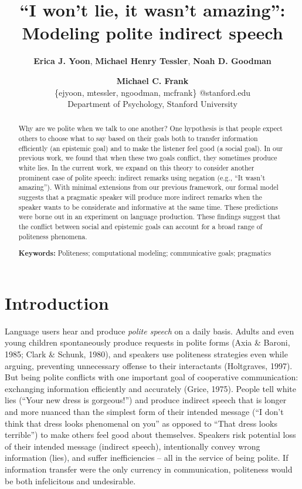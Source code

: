 \documentclass[10pt, letterpaper]{article}
\title{``I won't lie, it wasn't amazing'': Modeling polite indirect speech}
\author{{\large \bf Erica J. Yoon}, {\large \bf Michael Henry Tessler}, {\large \bf Noah D. Goodman} \and {\large \bf Michael C. Frank}  \\
        \{ejyoon, mtessler, ngoodman, mcfrank\} @stanford.edu \\ 
        Department of Psychology, Stanford University}
\begin{document}
\maketitle

\begin{abstract}
Why are we polite when we talk to one another? One hypothesis is that
people expect others to choose what to say based on their goals both to
transfer information efficiently (an epistemic goal) and to make the
listener feel good (a social goal). In our previous work, we found that
when these two goals conflict, they sometimes produce white lies. In the
current work, we expand on this theory to consider another prominent
case of polite speech: indirect remarks using negation (e.g., ``It
wasn't amazing''). With minimal extensions from our previous framework,
our formal model suggests that a pragmatic speaker will produce more
indirect remarks when the speaker wants to be considerate and
informative at the same time. These predictions were borne out in an
experiment on language production. These findings suggest that the
conflict between social and epistemic goals can account for a broad
range of politeness phenomena.

\textbf{Keywords:}
Politeness; computational modeling; communicative goals; pragmatics
\end{abstract}

 
 

\newcommand{\ejy}[1]{\textcolor{Red}{[ejy: #1]}}  
\newcommand{\ndg}[1]{\textcolor{Green}{[ndg: #1]}}  
\newcommand{\mht}[1]{\textcolor{Blue}{[mht: #1]}}  
\newcommand{\mcf}[1]{\textcolor{Orange}{[mcf: #1]}}







\section{Introduction}\label{introduction}

Language users hear and produce \emph{polite speech} on a daily basis.
Adults and even young children spontaneously produce requests in polite
forms (Axia \& Baroni, 1985; Clark \& Schunk, 1980), and speakers use
politeness strategies even while arguing, preventing unnecessary offense
to their interactants (Holtgraves, 1997). But being polite conflicts
with one important goal of cooperative communication: exchanging
information efficiently and accurately (Grice, 1975). People tell white
lies (``Your new dress is gorgeous!'') and produce indirect speech that
is longer and more nuanced than the simplest form of their intended
message (``I don't think that dress looks phenomenal on you'' as opposed
to ``That dress looks terrible'') to make others feel good about
themselves. Speakers risk potential loss of their intended message
(indirect speech), intentionally convey wrong information (lies), and
suffer inefficiencies -- all in the service of being polite. If
information transfer were the only currency in communication, politeness
would be both infelicitous and undesirable.\\
\end{document}
